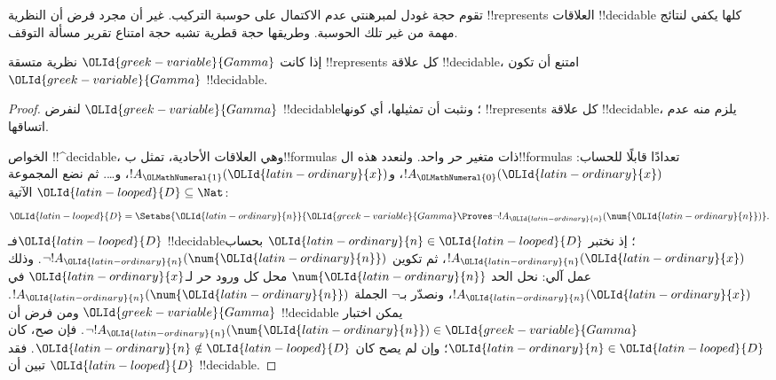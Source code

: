 \documentclass[../../../include/open-logic-section]{subfiles}
\begin{document}


تقوم حجة غودل لمبرهنتي عدم الاكتمال على حوسبة
التركيب. غير أن مجرد فرض أن النظرية !!{represents}
العلاقات !!{decidable} كلها يكفي لنتائج مهمة
من غير تلك الحوسبة. وطريقها حجة قطرية تشبه
حجة امتناع تقرير مسألة التوقف.

\begin{thm}
إذا كانت $\OLId{greek-variable}{Gamma}$ نظرية متسقة !!{represents}
كل علاقة !!{decidable}، امتنع أن تكون $\OLId{greek-variable}{Gamma}$
!!{decidable}.
\end{thm}

\begin{proof}
لنفرض $\OLId{greek-variable}{Gamma}$ !!{decidable}؛ ونثبت أن
تمثيلها، أي كونها !!{represents} كل علاقة
!!{decidable}، يلزم منه عدم اتساقها.

الخواص !!^{decidable}، وهي العلاقات الأحادية،
تمثل ب!!{formula}s ذات متغير حر واحد.
ولنعدد هذه ال!!{formula}s تعدادًا قابلًا
للحساب: $!A_\OLMathNumeral{0}(\OLId{latin-ordinary}{x})$، و$!A_\OLMathNumeral{1}(\OLId{latin-ordinary}{x})$، و\dots.
ثم نضع المجموعة $\OLId{latin-looped}{D}\subseteq\Nat$ الآتية:
\[
\OLId{latin-looped}{D} = \Setabs{\OLId{latin-ordinary}{n}}{\OLId{greek-variable}{Gamma} \Proves \lnot !A_\OLId{latin-ordinary}{n}(\num{\OLId{latin-ordinary}{n}})}.
\]
فـ$\OLId{latin-looped}{D}$ !!{decidable}؛ إذ نختبر $\OLId{latin-ordinary}{n}\in \OLId{latin-looped}{D}$
بحساب $!A_\OLId{latin-ordinary}{n}(\OLId{latin-ordinary}{x})$، ثم تكوين $\lnot !A_\OLId{latin-ordinary}{n}(\num{\OLId{latin-ordinary}{n}})$.
وذلك عمل آلي: نحل الحد $\num{\OLId{latin-ordinary}{n}}$ محل كل
ورود حر لـ$\OLId{latin-ordinary}{x}$ في $!A_\OLId{latin-ordinary}{n}(\OLId{latin-ordinary}{x})$، ونصدّر بـ$\lnot$
الجملة $!A_\OLId{latin-ordinary}{n}(\num{\OLId{latin-ordinary}{n}})$. ومن فرض أن $\OLId{greek-variable}{Gamma}$
!!{decidable} يمكن اختبار
$\lnot !A_\OLId{latin-ordinary}{n}(\num{\OLId{latin-ordinary}{n}})\in\OLId{greek-variable}{Gamma}$. فإن صح،
كان $\OLId{latin-ordinary}{n}\in \OLId{latin-looped}{D}$؛ وإن لم يصح كان $\OLId{latin-ordinary}{n}\notin \OLId{latin-looped}{D}$.
فقد تبين أن $\OLId{latin-looped}{D}$ !!{decidable}.


\end{proof}
\end{document}
